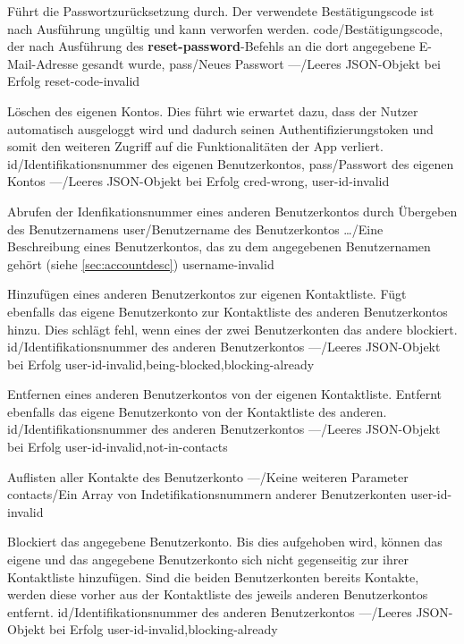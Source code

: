\documentclass[parskip=full,11pt]{scrartcl}
\begin{document}
{Führt die Passwortzurücksetzung durch.
Der verwendete Bestätigungscode ist nach Ausführung ungültig und kann
verworfen werden.}
{code/Bestätigungscode{,} der nach Ausführung des \textbf{reset-password}-Befehls
an die dort angegebene E-Mail-Adresse gesandt wurde,
pass/Neues Passwort}
{---/Leeres JSON-Objekt bei Erfolg}
{reset-code-invalid}

{Löschen des eigenen Kontos. Dies führt wie erwartet dazu{,}
dass der Nutzer automatisch ausgeloggt wird und dadurch seinen
Authentifizierungstoken und somit den weiteren Zugriff auf die Funktionalitäten
der App verliert.}
{id/Identifikationsnummer des eigenen Benutzerkontos,
pass/Passwort des eigenen Kontos}
{---/Leeres JSON-Objekt bei Erfolg}
{cred-wrong, user-id-invalid}

{Abrufen der Idenfikationsnummer eines anderen Benutzerkontos durch Übergeben
des Benutzernamens}
{user/Benutzername des Benutzerkontos}
{\dots/Eine Beschreibung eines Benutzerkontos{,} das zu dem angegebenen
Benutzernamen gehört (siehe \ref{sec:accountdesc})}
{username-invalid}

{Hinzufügen eines anderen Benutzerkontos zur eigenen Kontaktliste.
Fügt ebenfalls das eigene Benutzerkonto zur Kontaktliste des anderen
Benutzerkontos hinzu.
Dies schlägt fehl, wenn eines der zwei Benutzerkonten das andere blockiert.}
{id/Identifikationsnummer des anderen Benutzerkontos}
{---/Leeres JSON-Objekt bei Erfolg}
{user-id-invalid,being-blocked,blocking-already}

{Entfernen eines anderen Benutzerkontos von der eigenen Kontaktliste.
Entfernt ebenfalls das eigene Benutzerkonto von der Kontaktliste des anderen.}
{id/Identifikationsnummer des anderen Benutzerkontos}
{---/Leeres JSON-Objekt bei Erfolg}
{user-id-invalid,not-in-contacts}

{Auflisten aller Kontakte des Benutzerkonto}
{---/Keine weiteren Parameter}
{contacts/Ein Array von Indetifikationsnummern anderer Benutzerkonten}
{user-id-invalid}

{Blockiert das angegebene Benutzerkonto.
Bis dies aufgehoben wird, können das eigene und das angegebene
Benutzerkonto sich nicht gegenseitig zur ihrer Kontaktliste hinzufügen.
Sind die beiden Benutzerkonten bereits Kontakte, werden diese vorher aus der
Kontaktliste des jeweils anderen Benutzerkontos entfernt.}
{id/Identifikationsnummer des anderen Benutzerkontos}
{---/Leeres JSON-Objekt bei Erfolg}
{user-id-invalid,blocking-already}
\end{document}
